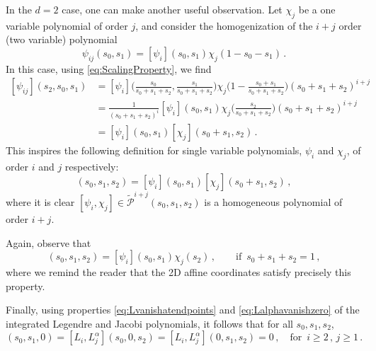 In the $d=2$ case, one can make another useful observation.
Let $\chi_j$ be a one variable polynomial of order $j$, and consider the homogenization of the $i+j$ order (two variable) polynomial
\begin{equation}
	\psi_{ij}(s_0,s_1) = [\psi_i](s_0,s_1)\chi_j(1-s_0-s_1)\,.
\end{equation}
In this case, using \eqref{eq:ScalingProperty}, we find
\begin{equation}
	\begin{aligned}
		{}[\psi_{ij}](s_2,s_0,s_1)&=[\psi_i]\Big(\frac{s_0}{s_0+s_1+s_2},\frac{s_1}{s_0+s_1+s_2}\Big)
				\chi_j\Big(1-\frac{s_0+s_1}{s_0+s_1+s_2}\Big)(s_0+s_1+s_2)^{i+j}\\
			&=\frac{1}{(s_0+s_1+s_2)^{i}}[\psi_i](s_0,s_1)\chi_j\Big(\frac{s_2}{s_0+s_1+s_2}\Big)(s_0+s_1+s_2)^{i+j}\\
			&=[\psi_i](s_0,s_1)[\chi_j](s_0+s_1,s_2)\,.%
			\label{eq:homogproduct}
	\end{aligned}
\end{equation}
This inspires the following definition for single variable polynomials, $\psi_i$ and $\chi_j$, of order $i$ and $j$ respectively:
\begin{equation}
	[\psi_i,\chi_j](s_0,s_1,s_2)= [\psi_i](s_0,s_1)[\chi_j](s_0+s_1,s_2)\,,
\end{equation}
where it is clear $[\psi_i,\chi_j]\in\tilde{\mathcal{P}}^{i+j}(s_0,s_1,s_2)$ is a homogeneous polynomial of order $i+j$.

Again, observe that
\begin{equation}
	[\psi_i,\chi_j](s_0,s_1,s_2)=[\psi_i](s_0,s_1)\chi_j(s_2)\,,\quad\quad\text{if }\,s_0+s_1+s_2=1\,,
\end{equation}
where we remind the reader that the 2D affine coordinates satisfy precisely this property.

Finally, using properties \eqref{eq:Lvanishatendpoints} and \eqref{eq:Lalphavanishzero} of the integrated Legendre and Jacobi polynomials, it follows that for all $s_0,s_1,s_2$,
\begin{equation}
	[L_i,L_j^\alpha](s_0,s_1,0)=[L_i,L_j^\alpha](s_0,0,s_2)=[L_i,L_j^\alpha](0,s_1,s_2)=0\,,\quad\text{for }\,i\geq2\,,\,j\geq1\,.
	\label{eq:LiLjvanishing}
\end{equation}

